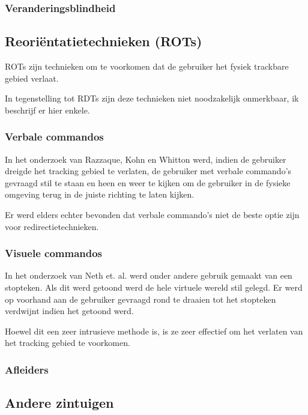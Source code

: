 \documentclass[a4paper,12pt]{article}
\begin{document}
\subsubsection{Veranderingsblindheid}


\subsection{Reori\"entatietechnieken (ROTs)}
ROTs zijn technieken om te voorkomen dat de gebruiker het fysiek trackbare gebied
verlaat.

In tegenstelling tot RDTs zijn deze technieken niet noodzakelijk onmerkbaar, ik
beschrijf er hier enkele.


\subsubsection{Verbale commandos}
In het onderzoek van Razzaque, Kohn en Whitton\cite{kohn01} werd, indien de
gebruiker dreigde het tracking gebied te verlaten, de gebruiker met verbale
commando's gevraagd stil te staan en heen en weer te kijken om de gebruiker in
de fysieke omgeving terug in de juiste richting te laten kijken.

Er werd elders\cite{peck09} echter bevonden dat verbale commando's niet de beste 
optie zijn voor redirectietechnieken.


\subsubsection{Visuele commandos}
In het onderzoek van Neth et. al.\cite{neth12} werd onder andere gebruik gemaakt
van een stopteken. Als dit werd getoond werd de hele virtuele wereld stil gelegd.
Er werd op voorhand aan de gebruiker gevraagd rond te draaien tot het stopteken
verdwijnt indien het getoond werd.

Hoewel dit een zeer intrusieve methode is, is ze zeer effectief om het verlaten
van het tracking gebied te voorkomen.


\subsubsection{Afleiders}


\subsection{Andere zintuigen}
\end{document}
